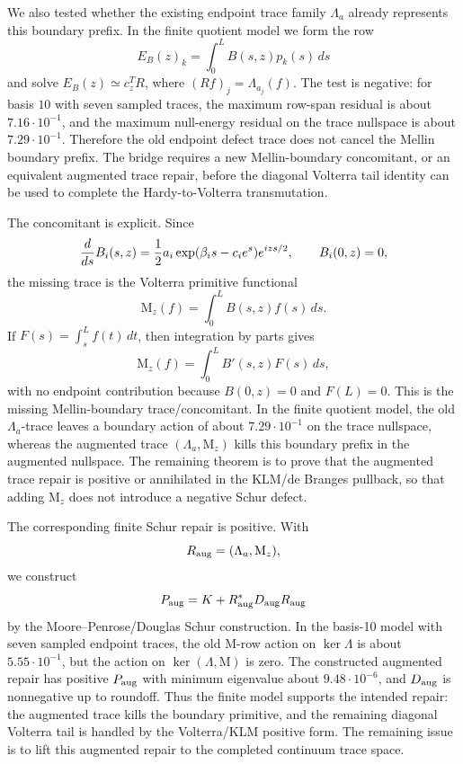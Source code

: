 \documentclass[11pt]{article}
\newcommand{\Mu}{\mathrm{M}}
\begin{document}
We also tested whether the existing endpoint trace family \(\Lambda_a\) already
represents this boundary prefix.  In the finite quotient model we form the row
\[
  E_B(z)_k=\int_0^L B(s,z)p_k(s)\,ds
\]
and solve \(E_B(z)\simeq c_z^T R\), where
\((Rf)_j=\Lambda_{a_j}(f)\).  The test is negative: for basis \(10\) with
seven sampled traces, the maximum row-span residual is about \(7.16\cdot
10^{-1}\), and the maximum null-energy residual on the trace nullspace is
about \(7.29\cdot 10^{-1}\).  Therefore the old endpoint defect trace does
not cancel the Mellin boundary prefix.  The bridge requires a new
Mellin-boundary concomitant, or an equivalent augmented trace repair, before
the diagonal Volterra tail identity can be used to complete the
Hardy-to-Volterra transmutation.

The concomitant is explicit.  Since
\[
  {d\over ds}B_i(s,z)
  ={1\over 2}a_i\exp(\beta_i s-c_i e^s)e^{izs/2},
  \qquad B_i(0,z)=0,
\]
the missing trace is the Volterra primitive functional
\[
  \Mu_z(f)=\int_0^L B(s,z)f(s)\,ds .
\]
If \(F(s)=\int_s^L f(t)\,dt\), then integration by parts gives
\[
  \Mu_z(f)=\int_0^L B'(s,z)F(s)\,ds,
\]
with no endpoint contribution because \(B(0,z)=0\) and \(F(L)=0\).  This is
the missing Mellin-boundary trace/concomitant.  In the finite quotient model,
the old \(\Lambda_a\)-trace leaves a boundary action of about \(7.29\cdot
10^{-1}\) on the trace nullspace, whereas the augmented trace
\((\Lambda_a,\Mu_z)\) kills this boundary prefix in the augmented nullspace.
The remaining theorem is to prove that the augmented trace repair is positive
or annihilated in the KLM/de Branges pullback, so that adding \(\Mu_z\) does
not introduce a negative Schur defect.

The corresponding finite Schur repair is positive.  With
\[
  R_{\rm aug}=(\Lambda_a,\Mu_z),
\]
we construct
\[
  P_{\rm aug}=K+R_{\rm aug}^*D_{\rm aug}R_{\rm aug}
\]
by the Moore--Penrose/Douglas Schur construction.  In the basis-10 model with
seven sampled endpoint traces, the old \(\Mu\)-row action on
\(\ker\Lambda\) is about \(5.55\cdot 10^{-1}\), but the action on
\(\ker(\Lambda,\Mu)\) is zero.  The constructed augmented repair has
positive \(P_{\rm aug}\) with minimum eigenvalue about \(9.48\cdot 10^{-6}\),
and \(D_{\rm aug}\) is nonnegative up to roundoff.  Thus the finite model
supports the intended repair: the augmented trace kills the boundary primitive,
and the remaining diagonal Volterra tail is handled by the Volterra/KLM
positive form.  The remaining issue is to lift this augmented repair to the
completed continuum trace space.
\end{document}
